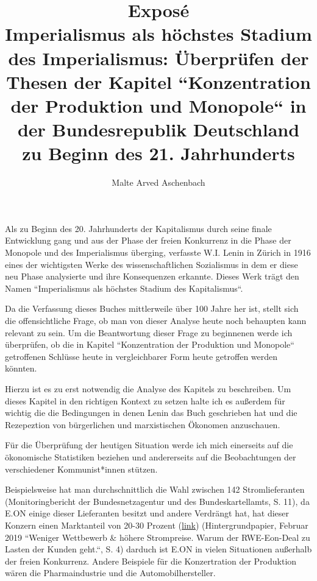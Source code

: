 \documentclass[a4paper]{article}
\title{Exposé\\Imperialismus als höchstes Stadium des Imperialismus: Überprüfen der Thesen der Kapitel ``Konzentration der Produktion und Monopole`` in der Bundesrepublik Deutschland zu Beginn des 21. Jahrhunderts}
\author{Malte Arved Aschenbach}
\begin{document}
    \maketitle
    Als zu Beginn des 20. Jahrhunderts der Kapitalismus durch seine finale Entwicklung gang und aus der Phase der freien Konkurrenz in die Phase der Monopole und des Imperialismus überging, verfasste W.I. Lenin in Zürich in 1916 eines der wichtigsten Werke des wissenschaftlichen Sozialismus in dem er diese neu Phase analysierte und ihre Konsequenzen erkannte. Dieses Werk trägt den Namen ``Imperialismus als höchstes Stadium des Kapitalismus``.
    
    Da die Verfassung dieses Buches mittlerweile über 100 Jahre her ist, stellt sich die offensichtliche Frage, ob man von dieser Analyse heute noch behaupten kann relevant zu sein. Um die Beantwortung dieser Frage zu beginnenen werde ich überprüfen, ob die in Kapitel ``Konzentration der Produktion und Monopole`` getroffenen Schlüsse heute in vergleichbarer Form heute getroffen werden könnten.
    
    Hierzu ist es zu erst notwendig die Analyse des Kapitels zu beschreiben. Um dieses Kapitel in den richtigen Kontext zu setzen halte ich es außerdem für wichtig die die Bedingungen in denen Lenin das Buch geschrieben hat und die Rezepeztion von bürgerlichen und marxistischen Ökonomen anzuschauen.

    Für die Überprüfung der heutigen Situation werde ich mich einerseits auf die ökonomische Statistiken beziehen und andererseits auf die Beobachtungen der verschiedener Kommunist*innen stützen.
    
    Beispielsweise hat man durchschnittlich die Wahl zwischen 142 Stromlieferanten (Monitoringbericht der Bundesnetzagentur und des Bundeskartellamts, S. 11), da E.ON einige dieser Lieferanten besitzt und andere Verdrängt hat, hat dieser Konzern einen Marktanteil von 20-30 Prozent (\href{https://www.welt.de/wirtschaft/article189294857Strommarkt-Angst-vor-Dominanz-von-E-on-und-RWE-waechst.html}{link}) (Hintergrundpapier, Februar 2019 ``Weniger Wettbewerb \& höhere Strompreise. Warum der RWE-Eon-Deal zu Lasten der Kunden geht.``, S. 4) darduch ist E.ON in vielen Situationen außerhalb der freien Konkurrenz. Andere Beispiele für die Konzertration der Produktion wären die Pharmaindustrie und die Automobilhersteller. 
    
\end{document}
